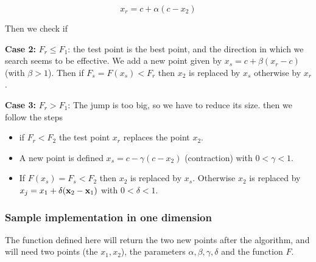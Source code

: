 \documentclass[11pt]{article}
\providecommand{\tightlist}{%
      \setlength{\itemsep}{0pt}\setlength{\parskip}{0pt}}
\begin{document}
\[
x_r = c+\alpha(c-x_2)
\]

Then we check if

\textbf{Case 2:} \(F_r \leq F_1\): the test point is the best point, and
the direction in which we search seems to be effective. We add a new
point given by \(x_s = c+\beta (x_r-c)\) (with \(\beta > 1\)). Then if
\(F_s=F(x_s)<F_r\) then \(x_2\) is replaced by \(x_s\) otherwise by
\(x_r\).

\textbf{Case 3:} \(F_r > F_1\): The jump is too big, so we have to
reduce its size. then we follow the steps

\begin{itemize}
\tightlist
\item
  if \(F_r < F_2\) the test point \(x_r\) replaces the point \(x_2\).
\item
  A new point is defined \(x_s= c-\gamma(c-x_2)\) (contraction) with
  \(0<\gamma<1\).
\item
  If \(F(x_s) =F_s<F_2\) then \(x_2\) is replaced by \(x_s\). Otherwise
  \(x_2\) is replaced by \(x_j=x_1+\delta ({\bf x}_2-{\bf x}_1)\) with
  \(0<\delta<1\).
\end{itemize}

    \subsubsection{Sample implementation in one
dimension}\label{sample-implementation-in-one-dimension}

The function defined here will return the two new points after the
algorithm, and will need two points (the \(x_1, x_2\)), the parameters
\(\alpha, \beta, \gamma, \delta\) and the function \(F\).
\end{document}
